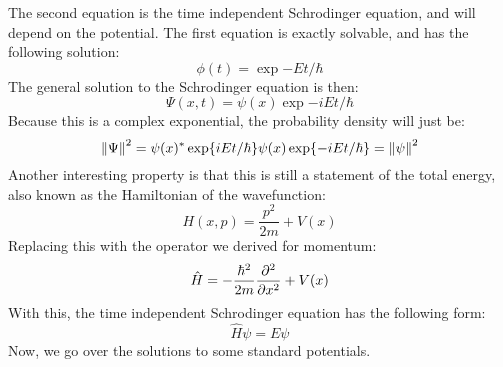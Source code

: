 The second equation is the time independent Schrodinger equation, and will depend on the potential. The first equation is exactly solvable, and has the following solution:
\begin{equation*}
  \phi(t)=\exp{-Et/\hbar}
\end{equation*}
The general solution to the Schrodinger equation is then:
\begin{equation*}
  \Psi(x,t)=\psi(x)\exp{-iEt/\hbar}
\end{equation*}
Because this is a complex exponential, the probability density will just be:
\begin{equation*}
  \norm{\Psi}^2=\psi(x)^*\exp{iEt/\hbar}\psi(x)\exp{-iEt/\hbar}=\norm{\psi}^2
\end{equation*}
Another interesting property is that this is still a statement of the total energy, also known as the Hamiltonian of the wavefunction:
\begin{equation*}
  H(x,p)=\dfrac{p^2}{2m}+V(x)
\end{equation*}
Replacing this with the operator we derived for momentum:
\begin{equation*}
  \hat{H}=-\dfrac{\hbar^2}{2m}\pdv[2]{x}+V(x)
\end{equation*}
With this, the time independent Schrodinger equation has the following form:
\begin{equation*}
  \hat{H}\psi=E\psi
\end{equation*}
Now, we go over the solutions to some standard potentials.

